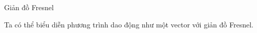 \begin{frame}{Giản đồ Fresnel}
    \begin{center}
        \begin{minipage}{0.4\linewidth}
        \resizebox{0.75\linewidth}{!}{}
        \end{minipage}
        \hspace{1mm}
        \begin{minipage}{0.4\linewidth}
        \resizebox{1\linewidth}{!}{}
        \end{minipage}
    \end{center}
    Ta có thể biểu diễn phương trình dao động như một vector với giản đồ Fresnel.
\end{frame}